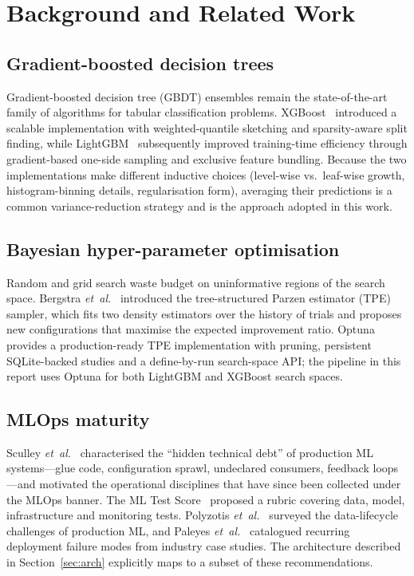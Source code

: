 \documentclass[conference,a4paper,10pt]{IEEEtran}
\begin{document}
\section{Background and Related Work}\label{sec:background}

\subsection{Gradient-boosted decision trees}
Gradient-boosted decision tree (GBDT) ensembles remain the
state-of-the-art family of algorithms for tabular classification
problems. XGBoost~\cite{chen2016xgboost} introduced a scalable
implementation with weighted-quantile sketching and sparsity-aware split
finding, while LightGBM~\cite{ke2017lightgbm} subsequently improved
training-time efficiency through gradient-based one-side sampling and
exclusive feature bundling. Because the two implementations make
different inductive choices (level-wise vs.\ leaf-wise growth,
histogram-binning details, regularisation form), averaging their
predictions is a common variance-reduction strategy and is the approach
adopted in this work.

\subsection{Bayesian hyper-parameter optimisation}
Random and grid search waste budget on uninformative regions of the
search space. Bergstra \emph{et~al.}~\cite{bergstra2011tpe} introduced
the tree-structured Parzen estimator (TPE) sampler, which fits two
density estimators over the history of trials and proposes new
configurations that maximise the expected improvement ratio.
Optuna~\cite{akiba2019optuna} provides a production-ready TPE
implementation with pruning, persistent SQLite-backed studies and a
define-by-run search-space API; the pipeline in this report uses Optuna
for both LightGBM and XGBoost search spaces.

\subsection{MLOps maturity}
Sculley \emph{et~al.}~\cite{sculley2015hidden} characterised the
``hidden technical debt'' of production ML systems---glue code,
configuration sprawl, undeclared consumers, feedback loops---and
motivated the operational disciplines that have since been collected
under the MLOps banner. The ML Test Score~\cite{breck2017mltestscore}
proposed a rubric covering data, model, infrastructure and monitoring
tests. Polyzotis \emph{et~al.}~\cite{polyzotis2018data} surveyed the
data-lifecycle challenges of production ML, and Paleyes
\emph{et~al.}~\cite{paleyes2022deploy} catalogued recurring deployment
failure modes from industry case studies. The architecture described in
Section~\ref{sec:arch} explicitly maps to a subset of these
recommendations.
\end{document}
